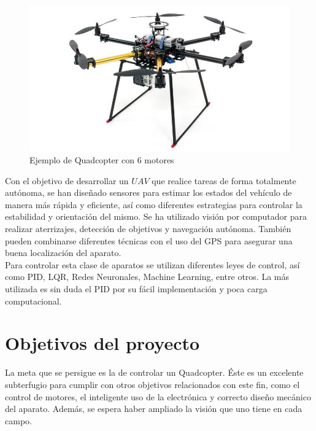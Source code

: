 \documentclass[twoside,11pt]{book}
\begin{document}
\begin{figure}[h!]
\begin{center}
\includegraphics[scale=0.3,bb=0 0 650 350]{images/6_armed_quadcopter.png}
\caption{Ejemplo de Quadcopter con 6 motores}
\end{center}
\end{figure}

Con el objetivo de desarrollar un $UAV$ que realice tareas de forma totalmente autónoma, se han diseñado sensores para estimar los estados del vehículo de manera más rápida y eficiente, así como diferentes estrategias para controlar la estabilidad y orientación del mismo. Se ha utilizado visión  por computador para realizar aterrizajes, detección de objetivos y navegación autónoma. También pueden combinarse diferentes técnicas con el uso del GPS para asegurar una buena localización del aparato. \\

Para controlar esta clase de aparatos se utilizan diferentes leyes de control, así como PID, LQR, Redes Neuronales, Machine Learning, entre otros. La más utilizada es sin duda el PID por su fácil implementación y poca carga computacional.

\section{Objetivos del proyecto}

La meta que se persigue es la de controlar un Quadcopter. Éste es un excelente subterfugio para cumplir con otros objetivos relacionados con este fin, como el control de motores, el inteligente uso de la electrónica y correcto diseño mecánico del aparato. Además, se espera haber ampliado la visión que uno tiene en cada campo. \\
\end{document}
